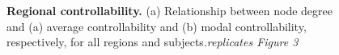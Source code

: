 \begin{figure}
 \caption{\textbf{Regional controllability.} (a) Relationship between node degree  and (a) average controllability and (b) modal controllability, respectively, 
 for all regions and subjects.\textit{replicates Figure 3}} 
 \label{fig:controllability-measures}
\end{figure}


